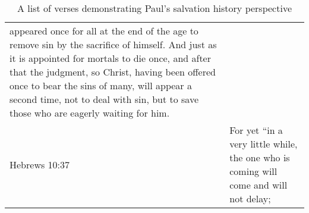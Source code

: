 \begin{table}
\begin{center}
\begin{tabulary}{\linewidth}{lL}
appeared once for all at the end of the age to remove sin by the sacrifice of 
himself. And just as it is appointed for mortals to die once, and after that 
the judgment, so Christ, having been offered once to bear the sins of many, 
will appear a second time, not to deal with sin, but to save those who are 
eagerly waiting for him. \\
Hebrews 10:37 & For yet ``in a very little while, the one who is 
coming will come and will not delay; \\
            \bottomrule
        \end{tabulary}
    \end{center}
    \caption{A list of verses demonstrating Paul's salvation history perspective}
\label{tab:shp-paul}
\end{table}
